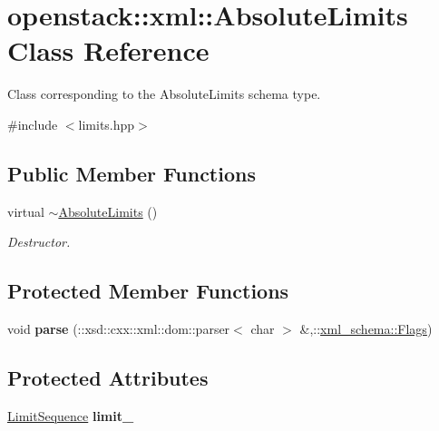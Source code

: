 \hypertarget{classopenstack_1_1xml_1_1AbsoluteLimits}{
\section{openstack::xml::AbsoluteLimits Class Reference}
\label{classopenstack_1_1xml_1_1AbsoluteLimits}
}


Class corresponding to the AbsoluteLimits schema type.  




{\ttfamily \#include $<$limits.hpp$>$}

\subsection*{Public Member Functions}
\begin{DoxyCompactItemize}
\item 
\hypertarget{classopenstack_1_1xml_1_1AbsoluteLimits_ab83ef101b34459fc8005573baa878751}{
virtual \hyperlink{classopenstack_1_1xml_1_1AbsoluteLimits_ab83ef101b34459fc8005573baa878751}{$\sim$AbsoluteLimits} ()}
\label{classopenstack_1_1xml_1_1AbsoluteLimits_ab83ef101b34459fc8005573baa878751}

\begin{DoxyCompactList}\small\item\em Destructor. \item\end{DoxyCompactList}\end{DoxyCompactItemize}
\subsection*{Protected Member Functions}
\begin{DoxyCompactItemize}
\item 
\hypertarget{classopenstack_1_1xml_1_1AbsoluteLimits_adca06eecacf50e82aef7fc7414d257b0}{
void {\bfseries parse} (::xsd::cxx::xml::dom::parser$<$ char $>$ \&,::\hyperlink{namespacexml__schema_affb4c227cbd9aa7453dd1dc5a1401943}{xml\_\-schema::Flags})}
\label{classopenstack_1_1xml_1_1AbsoluteLimits_adca06eecacf50e82aef7fc7414d257b0}

\end{DoxyCompactItemize}
\subsection*{Protected Attributes}
\begin{DoxyCompactItemize}
\item 
\hypertarget{classopenstack_1_1xml_1_1AbsoluteLimits_a9b890281b44d57405c8f358d9ac25240}{
\hyperlink{classopenstack_1_1xml_1_1AbsoluteLimits_ab7c2c30ecf1fa25041fc712630ea5169}{LimitSequence} {\bfseries limit\_\-}}
\label{classopenstack_1_1xml_1_1AbsoluteLimits_a9b890281b44d57405c8f358d9ac25240}

\end{DoxyCompactItemize}
